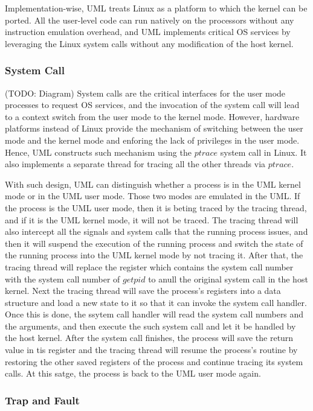 Implementation-wise, UML treats Linux as a platform to which the kernel can be ported. All the user-level code can run natively on the processors without any instruction emulation overhead, and UML implements critical OS services by leveraging the Linux system calls without any modification of the host kernel.  

\subsubsection{System Call}

(TODO: Diagram)
System calls are the critical interfaces for the user mode processes to request OS services, and the invocation of the system call will lead to a context switch from the user mode to the kernel mode. However, hardware platforms instead of Linux provide the mechanism of switching between the user mode and the kernel mode and enforing the lack of privileges in the user mode. Hence, UML constructs such mechanism using the $ptrace$ system call in Linux. It also implements a separate thread for tracing all the other threads via $ptrace$. 

With such design, UML can distinguish whether a process is in the UML kernel mode or in the UML user mode. Those two modes are emulated in the UML. If the process is the UML user mode, then it is beting traced by the tracing thread, and if it is the UML kernel mode, it will not be traced. The tracing thread will also intercept all the signals and system calls that the running process issues, and then it will suspend the execution of the running process and switch the state of the running process into the UML kernel mode by not tracing it. After that, the tracing thread will replace the register which contains the system call number with the system call number of $getpid$ to anull the original system call in the host kernel. Next the tracing thread will save the process's registers into a data structure and load a new state to it so that it can invoke the system call handler. Once this is done, the ssytem call handler will read the system call numbers and the arguments, and then execute the such system call and let it be handled by the host kernel. After the system call finishes, the process will save the return value in tis register and the tracing thread will resume the process's routine by restoring the other saved registers of the process and continue tracing its system calls. At this satge, the process is back to the UML user mode again.   

\subsubsection{Trap and Fault}

